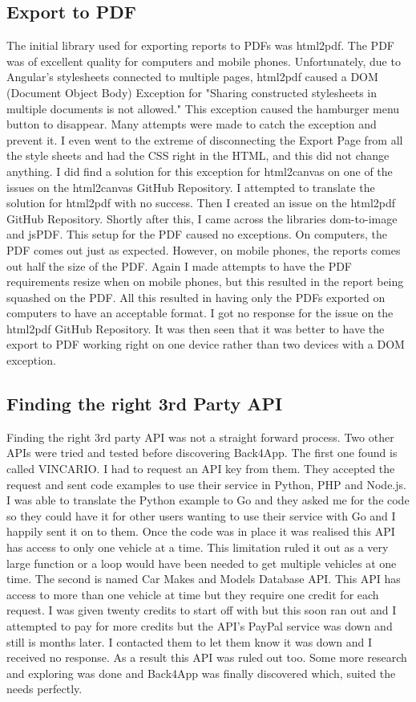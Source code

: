 \subsection{Export to PDF}
The initial library used for exporting reports to PDFs was html2pdf. The PDF was of excellent quality for computers and mobile phones. Unfortunately, due to Angular's stylesheets connected to multiple pages, html2pdf caused a DOM (Document Object Body) Exception for "Sharing constructed stylesheets in multiple documents is not allowed." This exception caused the hamburger menu button to disappear. Many attempts were made to catch the exception and prevent it. I even went to the extreme of disconnecting the Export Page from all the style sheets and had the CSS right in the HTML, and this did not change anything. I did find a solution for this exception for html2canvas on one of the issues on the html2canvas GitHub Repository. I attempted to translate the solution for html2pdf with no success. Then I created an issue on the html2pdf GitHub Repository. Shortly after this, I came across the libraries dom-to-image and jsPDF. This setup for the PDF caused no exceptions. On computers, the PDF comes out just as expected. However, on mobile phones, the reports comes out half the size of the PDF. Again I made attempts to have the PDF requirements resize when on mobile phones, but this resulted in the report being squashed on the PDF. All this resulted in having only the PDFs exported on computers to have an acceptable format. I got no response for the issue on the html2pdf GitHub Repository. It was then seen that it was better to have the export to PDF working right on one device rather than two devices with a DOM exception.

\subsection{Finding the right 3rd Party API}
Finding the right 3rd party API was not a straight forward process. Two other APIs were tried and tested before discovering Back4App. The first one found is called VINCARIO. I had to request an API key from them. They accepted the request and sent code examples to use their service in Python, PHP and Node.js. I was able to translate the Python example to Go and they asked me for the code so they could have it for other users wanting to use their service with Go and I happily sent it on to them. Once the code was in place it was realised this API has access to only one vehicle at a time. This limitation ruled it out as a very large function or a loop would have been needed to get multiple vehicles at one time. The second is named Car Makes and Models Database API. This API has access to more than one vehicle at time but they require one credit for each request. I was given twenty credits to start off with but this soon ran out and I attempted to pay for more credits but the API's PayPal service was down and still is months later. I contacted them to let them know it was down and I received no response. As a result this API was ruled out too. Some more research and exploring was done and Back4App was finally discovered which, suited the needs perfectly. 


